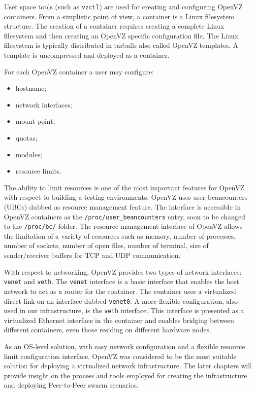User space tools (such as \texttt{vzctl}) are used for creating and
configuring OpenVZ containers. From a simplistic point of view, a container is
a Linux filesystem structure. The creation of a container requires creating a
complete Linux filesystem and then creating an OpenVZ specific configuration
file. The Linux filesystem is typically distributed in tarballs also called
OpenVZ templates. A template is uncompressed and deployed as a container.

For each OpenVZ container a user may configure:

\begin{itemize}
  \item hostname;
  \item network interfaces;
  \item mount point;
  \item quotas;
  \item modules;
  \item resource limits.
\end{itemize}

The ability to limit resources is one of the most important features for
OpenVZ with respect to building a testing environments. OpenVZ uses user
beancounters (UBCs) dubbed as resource management feature. The interface is
accessible in OpenVZ containers as the \texttt{/proc/user\_beancounters} entry,
soon to be changed to the \texttt{/proc/bc/} folder. The resource management
interface of OpenVZ allows the limitation of a variety of resources such as
memory, number of processes, number of sockets, number of open files, number
of terminal, size of sender/receiver buffers for TCP and UDP communication.

With respect to networking, OpenVZ provides two types of network interfaces:
\texttt{venet} and \texttt{veth}. The \texttt{venet} interface is a basic
interface that enables the host network to act as a router for the container.
The container uses a virtualized direct-link on an interface dubbed
\texttt{venet0}. A more flexible configuration, also used in our
infrastructure, is the \texttt{veth} interface. This interface is presented as
a virtualized Ethernet interface in the container and enables bridging
between different containers, even those residing on different hardware nodes.

As an OS-level solution, with easy network configuration and a flexible
resource limit configuration interface, OpenVZ was considered to be the most
suitable solution for deploying a virtualized network infrastructure. The
later chapters will provide insight on the process and tools employed for
creating the infrastructure and deploying Peer-to-Peer swarm scenarios.

